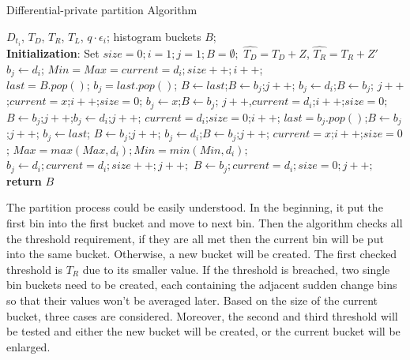 \documentclass[10pt,conference]{IEEEtran}
\begin{document}
\begin{algorithm}
	\caption{Differential-private partition Algorithm}   
	\label{DP-partition}   
	\begin{algorithmic}[1] %
		\Require $D_{t_i}$, $T_D$, $T_R$, $T_L$, $q\cdot \epsilon_i$;
		\Ensure  histogram buckets $B$;\\
		\textbf{Initialization}: Set $size=0;i=1;j=1;B=\emptyset;$
		\State $\hat{T_D}=T_D+Z$, $\hat{T_R}=T_R+Z'$
		\State $b_j\leftarrow d_i$; $Min=Max=current=d_i;size++;i++$;
		 \\
		\State $last = B.pop()$; $b_j=last.pop()$;
		\State $B\leftarrow last$;$B\leftarrow b_j$;$j++$; $b_j\leftarrow d_i$;$B\leftarrow b_j$;
		\State $j++$;$current=x$;$i++$;$size=0$;
		\Else {}
		\State $b_j\leftarrow x$;$B\leftarrow b_j$;
		\State $j++$,$current=d_i$;$i++$;$size=0$;
		\EndIf
		\State $B\leftarrow b_j$;$j++$;$b_j\leftarrow d_i$;$j++$;
		\State $current=d_i$;$size=0$;$i++$; 
		\State $last = b_j.pop()$;$B\leftarrow b_j$;$j++$; $b_j\leftarrow last$;
		\State $B\leftarrow b_j$;$j++$; $b_j\leftarrow d_i$;$B\leftarrow b_j$;$j++$;
		\State $current=x$;$i++$;$size=0$;
		\EndIf
		\State $Max=max(Max,d_i);Min=min(Min,d_i);$
		\State $b_j\leftarrow d_i;current=d_i;size++;j++;$
		\Else
		\State $B\leftarrow b_j;current=d_i;size=0;j++;$
		\EndIf
		\EndWhile\\
		\textbf{return} $B$
	\end{algorithmic}  
\end{algorithm} 

The partition process could be easily understood. In the beginning, it put the first bin into the first bucket and move to next bin. Then the algorithm checks all the threshold requirement, if they are all met then the current bin will be put into the same bucket. Otherwise, a new bucket will be created. The first checked threshold is $T_R$ due to its smaller value. If the threshold is breached, two single bin buckets need to be created, each containing the adjacent sudden change bins so that their values won't be averaged later. Based on the size of the current bucket, three cases are considered. Moreover, the second and third threshold will be tested and either the new bucket will be created, or the current bucket will be enlarged. 
\end{document}
